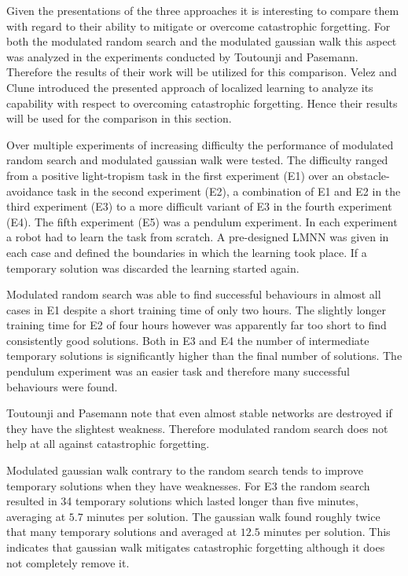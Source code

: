 \documentclass[12pt,twoside]{scrartcl}
\theoremstyle{plain}
\theoremstyle{definition}
\theoremstyle{remark}
\begin{document}
Given the presentations of the three approaches it is interesting to compare
them with regard to their ability to mitigate or overcome catastrophic forgetting.
For both the modulated random search and the modulated gaussian walk this aspect
was analyzed in the experiments conducted by Toutounji and Pasemann\cite{Toutounji2016}.
Therefore the results of their work will be utilized for this comparison.
Velez and Clune\cite{Velez2017} introduced the presented approach of localized
learning to analyze its capability with respect to overcoming catastrophic
forgetting. Hence their results will be used for the comparison in this section.

Over multiple experiments of increasing difficulty the performance of modulated
random search and modulated gaussian walk were tested. The difficulty ranged
from a positive light-tropism task in the first experiment (E1) over an
obstacle-avoidance task in the second experiment (E2), a combination of E1 and E2
in the third experiment (E3) to a more difficult variant of E3 in the fourth
experiment (E4). The fifth experiment (E5) was a pendulum experiment.
In each experiment a robot had to learn the task from scratch. A pre-designed
LMNN was given in each case and defined the boundaries in which the learning
took place. If a temporary solution was discarded the learning started again.

Modulated random search was able to find successful behaviours in almost all
cases in E1 despite a short training time of only two hours. The slightly
longer training time for E2 of four hours however was apparently far too short
to find consistently good solutions. Both in E3 and E4 the number of intermediate
temporary solutions is significantly higher than the final number of solutions.
The pendulum experiment was an easier task and therefore many successful
behaviours were found.

Toutounji and Pasemann note that even almost stable networks are destroyed
if they have the slightest weakness. Therefore modulated random search
does not help at all against catastrophic forgetting.

Modulated gaussian walk contrary to the random search tends to improve temporary
solutions when they have weaknesses. For E3 the random search resulted in 34
temporary solutions which lasted longer than five minutes, averaging at \(5.7\)
minutes per solution. The gaussian walk found roughly twice that many temporary
solutions and averaged at \(12.5\) minutes per solution. This indicates that
gaussian walk mitigates catastrophic forgetting although it does not completely
remove it.
\end{document}
